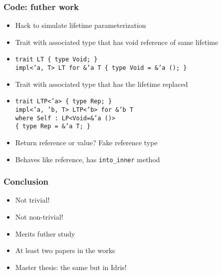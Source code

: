 \documentclass[xetex,mathserif,serif]{beamer}
\begin{document}
\begin{frame}
  \frametitle{Code: futher work}
  \begin{itemize}%
    \item Hack to simulate lifetime parameterization
    \item Trait with associated type that has void reference of same lifetime
    \item \texttt{trait LT \{ type Void; \}\\
      impl<'a, T> LT for \&'a T \{ type Void = \&'a (); \}}
    \item Trait with associated type that has the lifetime replaced
    \item \texttt{trait LTP<'a> \{ type Rep; \}\\
      impl<'a, 'b, T> LTP<'b> for \&'b T \\
      where Self : LP<Void=\&'a ()>\\
      \{ type Rep = \&'a T; \}}
    \item Return reference or value? Fake reference type
    \item Behaves like reference, has \texttt{into\_inner} method
  \end{itemize}
\end{frame}

\begin{frame}
  \frametitle{Conclusion}
  \begin{itemize}%
    \item Not trivial!
    \item Not non-trivial!
    \item Merits futher study
    \item At least two papers in the works
    \item Master thesis: the same but in Idris!
  \end{itemize}
\end{frame}
\end{document}
